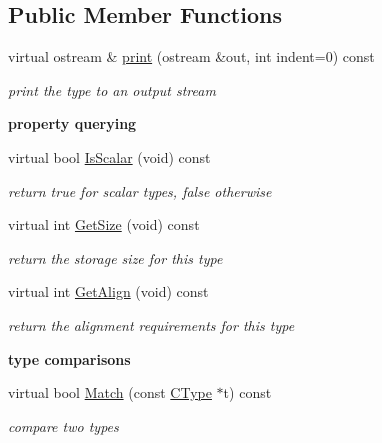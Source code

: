 \subsection*{Public Member Functions}
\begin{DoxyCompactItemize}
\item 
virtual ostream \& \hyperlink{classCIntType_a806090418b55a9b3adb4b5ab4c601723}{print} (ostream \&out, int indent=0) const 
\begin{DoxyCompactList}\small\item\em print the type to an output stream \end{DoxyCompactList}\end{DoxyCompactItemize}
\begin{Indent}{\bf property querying}\par
\begin{DoxyCompactItemize}
\item 
\hypertarget{classCIntType_aa402c5ec475c478c129fbe42d8776136}{virtual bool \hyperlink{classCIntType_aa402c5ec475c478c129fbe42d8776136}{Is\-Scalar} (void) const }\label{classCIntType_aa402c5ec475c478c129fbe42d8776136}

\begin{DoxyCompactList}\small\item\em return {\itshape true} for scalar types, {\itshape false} otherwise \end{DoxyCompactList}\item 
virtual int \hyperlink{classCIntType_a1a33a6a5c7cd1c35cce2373431721818}{Get\-Size} (void) const 
\begin{DoxyCompactList}\small\item\em return the storage size for this type \end{DoxyCompactList}\item 
virtual int \hyperlink{classCIntType_a185d12166a592b399055d659c8bc7c7d}{Get\-Align} (void) const 
\begin{DoxyCompactList}\small\item\em return the alignment requirements for this type \end{DoxyCompactList}\end{DoxyCompactItemize}
\end{Indent}
\begin{Indent}{\bf type comparisons}\par
\begin{DoxyCompactItemize}
\item 
virtual bool \hyperlink{classCIntType_af0578296d9b94dc4088c85f5dcb262cd}{Match} (const \hyperlink{classCType}{C\-Type} $\ast$t) const 
\begin{DoxyCompactList}\small\item\em compare two types \end{DoxyCompactList}\end{DoxyCompactItemize}
\end{Indent}
